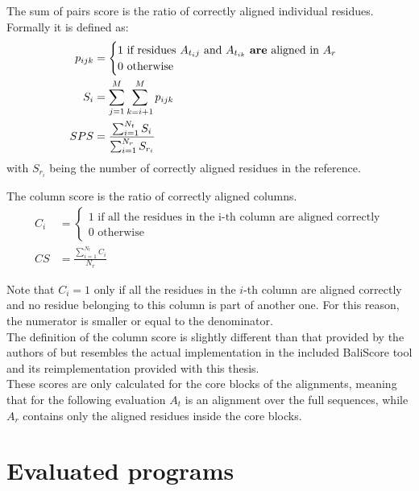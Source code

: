 \begin{mydef}
	The sum of pairs score is the ratio of correctly aligned individual residues. Formally it is defined as:
	\begin{align*}
		p_{ijk} &= \begin{cases}
		1 \text{ if residues $A_{t{_ij}}$ and $A_{t_{ik}}$ \textbf{are} aligned in $A_r$}\\
		0 \text{ otherwise}
		\end{cases} \\
		S_i &= \sum_{j=1}^{M} \sum_{k=i+1}^{M} p_{ijk} \\
		SPS &= \frac{\sum_{i=1}^{N_t} S_i} {\sum_{i=1}^{N_r} S_{r_i}}
 	\end{align*}
 	with $S_{r_i}$ being the number of correctly aligned residues in the reference.
\end{mydef}

\begin{mydef}
	The column score is the ratio of correctly aligned columns. 
	\begin{align*}
	C_i &= \begin{cases}
	1 \text{ if all the residues in the i-th column are aligned correctly}\\
	0 \text{ otherwise}
	\end{cases} \\
	CS &= \frac{\sum_{i=1}^{N_t} C_i}{N_r}
	\end{align*}
\end{mydef}
Note that $C_i = 1$ only if all the residues in the $i$-th column are aligned correctly and no residue belonging to this column is part of another one. For this reason, the numerator is smaller or equal to the denominator.\\
The definition of the column score is slightly different than that provided by the authors of \bb \cite{thompson1999comprehensive} but resembles the actual implementation in the included BaliScore tool and its reimplementation provided with this thesis.\\
These scores are only calculated for the core blocks of the \bb alignments, meaning that for the following evaluation $A_t$ is an alignment over the full sequences, while $A_r$ contains only the aligned residues inside the core blocks.




\section{Evaluated programs}


